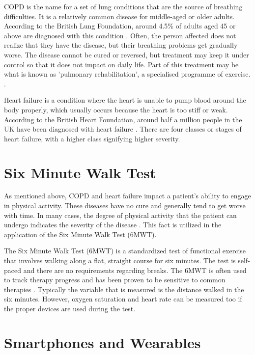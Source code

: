             COPD is the name for a set of lung conditions that are the source of breathing difficulties. It is a relatively common disease for middle-aged or older adults. According to the British Lung Foundation, around 4.5\% of adults aged 45 or above are diagnosed with this condition \cite{copd_stats}. Often, the person affected does not realize that they have the disease, but their breathing problems get gradually worse. The disease cannot be cured or reversed, but treatment may keep it under control so that it does not impact on daily life. Part of this treatment may be what is known as 'pulmonary rehabilitation', a specialised programme of exercise. \cite{copd_nhs}.

            Heart failure is a condition where the heart is unable to pump blood around the body properly, which usually occurs because the heart is too stiff or weak. According to the British Heart Foundation, around half a million people in the UK have been diagnosed with heart failure \cite{heart_failure_stats}. There are four classes or stages of heart failure, with a higher class signifying higher severity. 

        \section{Six Minute Walk Test}

            As mentioned above, COPD and heart failure impact a patient's ability to engage in physical activity. These diseases have no cure and generally tend to get worse with time. In many cases, the degree of physical activity that the patient can undergo indicates the severity of the disease \cite{six_minute_walk_test}. This fact is utilized in the application of the Six Minute Walk Test (6MWT).

            The Six Minute Walk Test (6MWT) is a standardized test of functional exercise that involves walking along a flat, straight course for six minutes. The test is self-paced and there are no requirements regarding breaks. The 6MWT is often used to track therapy progress and has been proven to be sensitive to common therapies \cite{six_minute_walk_test}. Typically the variable that is measured is the distance walked in the six minutes. However, oxygen saturation and heart rate can be measured too if the proper devices are used during the test.

        \section{Smartphones and Wearables}

